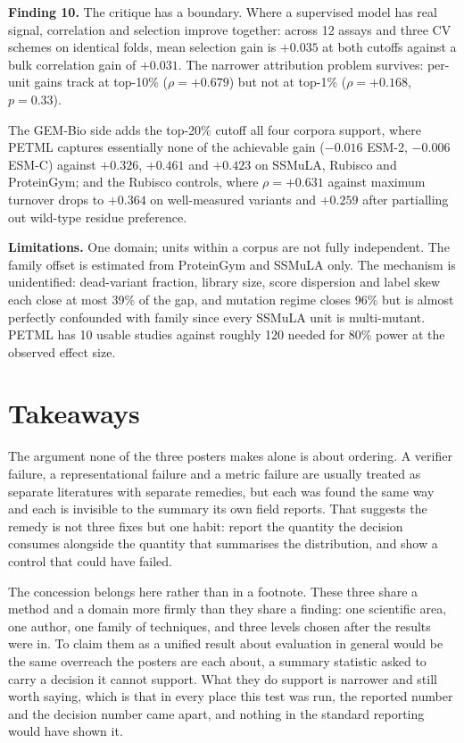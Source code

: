 \documentclass[11pt]{article}
\newcommand{\finding}[2]{\par\medskip\noindent\textbf{Finding #1.} #2\par\medskip}
\begin{document}
\finding{10}{The critique has a boundary. Where a supervised model has real signal, correlation and selection
improve together: across 12 assays and three CV schemes on identical folds, mean selection gain is $+0.035$ at
both cutoffs against a bulk correlation gain of $+0.031$. The narrower attribution problem survives: per-unit
gains track at top-10\% ($\rho = +0.679$) but not at top-1\% ($\rho = +0.168$, $p = 0.33$).}

The GEM-Bio side adds the top-20\% cutoff all four corpora support, where PETML captures essentially none of
the achievable gain ($-0.016$ ESM-2, $-0.006$ ESM-C) against $+0.326$, $+0.461$ and $+0.423$ on SSMuLA,
Rubisco and ProteinGym; and the Rubisco controls, where $\rho = +0.631$ against maximum turnover drops to
$+0.364$ on well-measured variants and $+0.259$ after partialling out wild-type residue preference.

\textbf{Limitations.} One domain; units within a corpus are not fully independent. The family offset is
estimated from ProteinGym and SSMuLA only. The mechanism is unidentified: dead-variant fraction, library size,
score dispersion and label skew each close at most 39\% of the gap, and mutation regime closes 96\% but is
almost perfectly confounded with family since every SSMuLA unit is multi-mutant. PETML has 10 usable studies
against roughly 120 needed for 80\% power at the observed effect size.

\section*{Takeaways}

The argument none of the three posters makes alone is about ordering. A verifier failure, a representational
failure and a metric failure are usually treated as separate literatures with separate remedies, but each was
found the same way and each is invisible to the summary its own field reports. That suggests the remedy is
not three fixes but one habit: report the quantity the decision consumes alongside the quantity that
summarises the distribution, and show a control that could have failed.

The concession belongs here rather than in a footnote. These three share a method and a domain more firmly
than they share a finding: one scientific area, one author, one family of techniques, and three levels chosen
after the results were in. To claim them as a unified result about evaluation in general would be the same
overreach the posters are each about, a summary statistic asked to carry a decision it cannot support. What
they do support is narrower and still worth saying, which is that in every place this test was run, the
reported number and the decision number came apart, and nothing in the standard reporting would have shown
it.
\end{document}
